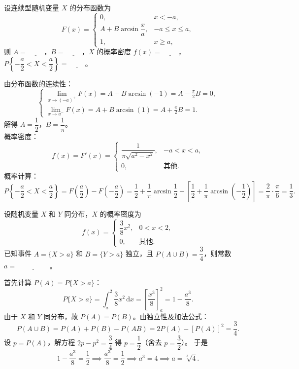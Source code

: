 \documentclass[lang=cn,11pt]{elegantbook}
\begin{document}
\begin{exercise}[反正弦分布] \label{exer:2-38}
设连续型随机变量 $X$ 的分布函数为
\[
F(x)=
\begin{cases}
0, & x<-a, \\[6pt]
A+B\arcsin\dfrac{x}{a}, & -a\leqslant x\leqslant a, \\[6pt]
1, & x\geqslant a,
\end{cases}
\]
则 $A=\underline{\hspace{1cm}}$，$B=\underline{\hspace{1cm}}$，$X$ 的概率密度 $f(x)=\underline{\hspace{1cm}}$，$P\left\{-\dfrac{a}{2}<X<\dfrac{a}{2}\right\}=\underline{\hspace{1cm}}$。
\end{exercise}
\begin{solution}
由分布函数的连续性：
\[
\begin{cases}
\displaystyle\lim_{x\to(-a)^+}F(x) = A+B\arcsin(-1) = A-\frac{\pi}{2}B = 0, \\[10pt]
\displaystyle\lim_{x\to a^-}F(x) = A+B\arcsin(1) = A+\frac{\pi}{2}B = 1.
\end{cases}
\]
解得 $A=\dfrac{1}{2}$，$B=\dfrac{1}{\pi}$。\\
概率密度：
\[
f(x) = F'(x) = 
\begin{cases}
\dfrac{1}{\pi\sqrt{a^2-x^2}}, & -a<x<a, \\[6pt]
0, & \text{其他}.
\end{cases}
\]
概率计算：
\[
P\left\{-\frac{a}{2}<X<\frac{a}{2}\right\} = F\left(\frac{a}{2}\right)-F\left(-\frac{a}{2}\right) = \frac{1}{2}+\frac{1}{\pi}\arcsin\frac{1}{2} - \left[\frac{1}{2}+\frac{1}{\pi}\arcsin\left(-\frac{1}{2}\right)\right] = \frac{2}{\pi}\cdot\frac{\pi}{6} = \frac{1}{3}.
\]
\end{solution}


\begin{exercise}[同分布随机变量参数求解] \label{exer:2-42}
设随机变量 $X$ 和 $Y$ 同分布，$X$ 的概率密度为
\[
f(x)=
\begin{cases}
\dfrac{3}{8}x^2, & 0<x<2, \\[6pt]
0, & \text{其他}.
\end{cases}
\]
已知事件 $A=\{X>a\}$ 和 $B=\{Y>a\}$ 独立，且 $P(A\cup B)=\dfrac{3}{4}$，则常数 $a=\underline{\hspace{2cm}}$。
\end{exercise}
\begin{solution}
首先计算 $P(A)=P\{X>a\}$：
\[
P\{X>a\} = \int_a^2 \frac{3}{8}x^2\,\mathrm{d}x = \left[\frac{x^3}{8}\right]_a^2 = 1 - \frac{a^3}{8}.
\]
由于 $X$ 和 $Y$ 同分布，故 $P(A)=P(B)$。由独立性及加法公式：
\[
P(A\cup B) = P(A) + P(B) - P(AB) = 2P(A) - [P(A)]^2 = \frac{3}{4}.
\]
设 $p=P(A)$，解方程 $2p-p^2=\dfrac{3}{4}$ 得 $p=\dfrac{1}{2}$（舍去 $p=\dfrac{3}{2}$）。
于是
\[
1 - \frac{a^3}{8} = \frac{1}{2} \implies \frac{a^3}{8} = \frac{1}{2} \implies a^3 = 4 \implies a = \sqrt[3]{4}.
\]
\end{solution}
\end{document}
